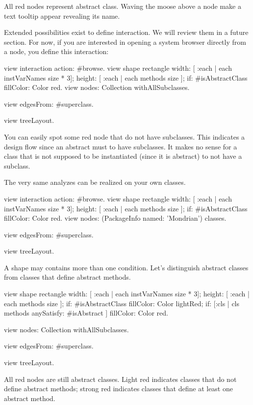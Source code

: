 \documentclass[a4paper,10pt,twoside]{book}
\begin{document}
All red nodes represent abstract class. Waving the moose above a node make a text tooltip appear revealing its name. 

Extended possibilities exist to define interaction. We will review them in a future section. For now, if you are interested in opening a system browser directly from a node, you define this interaction:

\begin{code}{}
view interaction action: #browse.
view shape rectangle
  width: [ :each | each instVarNames size * 3];
  height: [ :each | each methods size ];
  if: #isAbstractClass fillColor: Color red.
view nodes: Collection withAllSubclasses.

view edgesFrom: #superclass.

view treeLayout.
\end{code}

You can easily spot some red node that do not have subclasses. This indicates a design flow since an abstract must to have subclasses. It makes no sense for a class that is not supposed to be instantiated (since it is abstract) to not have a subclass.

The very same analyzes can be realized on your own classes.

\begin{code}{}
view interaction action: #browse.
view shape rectangle
  width: [ :each | each instVarNames size * 3];
  height: [ :each | each methods size ];
  if: #isAbstractClass fillColor: Color red.
view nodes: (PackageInfo named: 'Mondrian') classes.

view edgesFrom: #superclass.

view treeLayout.
\end{code}

A shape may contains more than one condition. Let's distinguish abstract classes from classes that define abstract methods.

\begin{code}{}
view shape rectangle
  width: [ :each | each instVarNames size * 3];
  height: [ :each | each methods size ];
  if: #isAbstractClass fillColor: Color lightRed;
  if: [:cls | cls methods anySatisfy: #isAbstract ] fillColor: Color red.

view nodes: Collection withAllSubclasses.

view edgesFrom: #superclass.

view treeLayout.
\end{code}

All red nodes are still abstract classes. Light red indicates classes that do not define abstract methods; strong red indicates classes that define at least one abstract method.
\end{document}
